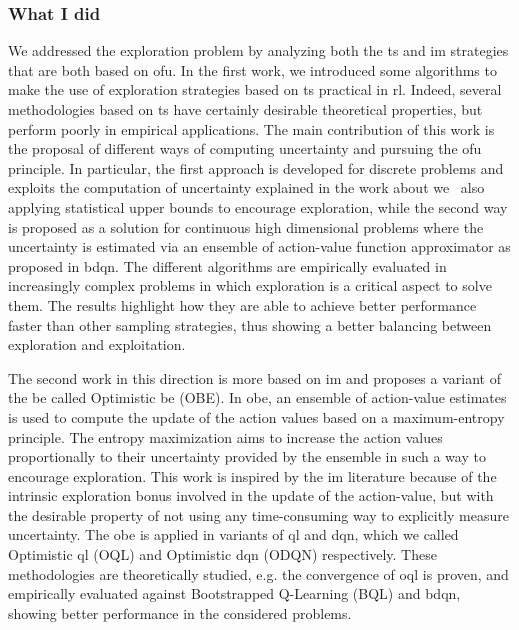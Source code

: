 \subsubsection{What I did}
We addressed the exploration problem by analyzing both the \gls{ts} and \gls{im} strategies that are both based on \gls{ofu}. In the first work, we introduced some algorithms to make the use of exploration strategies based on \gls{ts} practical in \gls{rl}. Indeed, several methodologies based on \gls{ts} have certainly desirable theoretical properties, but perform poorly in empirical applications. The main contribution of this work is the proposal of different ways of computing uncertainty and pursuing the \gls{ofu} principle. In particular, the first approach is developed for discrete problems and exploits the computation of uncertainty explained in the work about \gls{we}~\cite{deramo2016estimating} also applying statistical upper bounds to encourage exploration, while the second way is proposed as a solution for continuous high dimensional problems where the uncertainty is estimated via an ensemble of action-value function approximator as proposed in \gls{bdqn}. The different algorithms are empirically evaluated in increasingly complex problems in which exploration is a critical aspect to solve them. The results highlight how they are able to achieve better performance faster than other sampling strategies, thus showing a better balancing between exploration and exploitation.

The second work in this direction is more based on \gls{im} and proposes a variant of the \gls{be} called Optimistic \gls{be} (OBE). In \gls{obe}, an ensemble of action-value estimates is used to compute the update of the action values based on a maximum-entropy principle. The entropy maximization aims to increase the action values proportionally to their uncertainty provided by the ensemble in such a way to encourage exploration. This work is inspired by the \gls{im} literature because of the intrinsic exploration bonus involved in the update of the action-value, but with the desirable property of not using any time-consuming way to explicitly measure uncertainty. The \gls{obe} is applied in variants of \gls{ql} and \gls{dqn}, which we called Optimistic \gls{ql} (OQL) and Optimistic \gls{dqn} (ODQN) respectively. These methodologies are theoretically studied, e.g. the convergence of \gls{oql} is proven, and empirically evaluated against Bootstrapped Q-Learning (BQL) and \gls{bdqn}, showing better performance in the considered problems.

